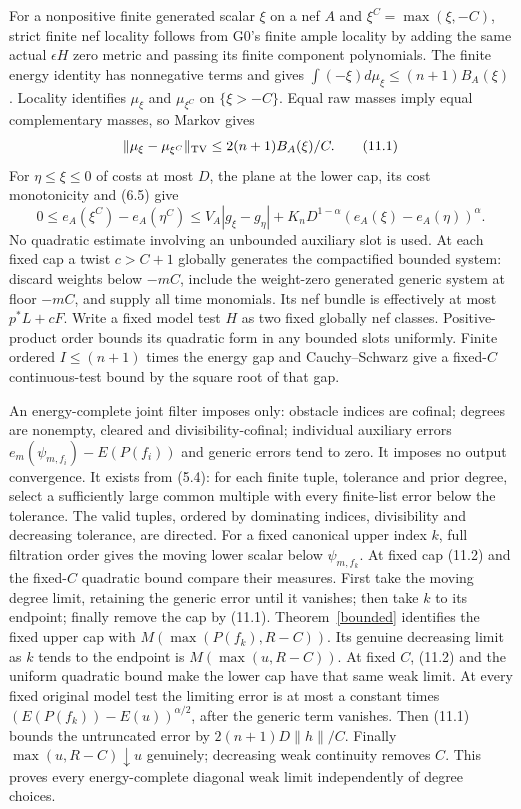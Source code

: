 \documentclass[10pt]{article}
\begin{document}
For a nonpositive finite generated scalar $\xi$ on a nef $A$ and
$\xi^C=\max(\xi,-C)$, strict finite nef locality follows from G0's
finite ample locality by adding the same actual $\epsilon H$ zero metric
and passing its finite component polynomials. The finite energy identity
has nonnegative terms and gives
$\int(-\xi)d\mu_\xi\leq(n+1)B_A(\xi)$.
Locality identifies $\mu_\xi$ and $\mu_{\xi^C}$ on $\{\xi>-C\}$.
Equal raw masses imply equal complementary masses, so Markov gives
\[
 \|\mu_\xi-\mu_{\xi^C}\|_{\rm TV}
       \leq 2(n+1)B_A(\xi)/C.
 \tag{11.1}
\]
For $\eta\leq\xi\leq0$ of costs at most $D$, the plane at the
lower cap, its cost monotonicity and (6.5) give
\[
 0\leq e_A(\xi^C)-e_A(\eta^C)
 \leq V_A|g_\xi-g_\eta|
       +K_nD^{1-\alpha}(e_A(\xi)-e_A(\eta))^\alpha.
 \tag{11.2}
\]
No quadratic estimate involving an unbounded auxiliary slot is used.
At each fixed cap a twist $c>C+1$ globally generates the compactified
bounded system: discard weights below $-mC$, include the weight-zero
generated generic system at floor $-mC$, and supply all time monomials.
Its nef bundle is effectively at most $p^*L+cF$.
Write a fixed model test $H$ as two fixed globally nef classes.
Positive-product order bounds its quadratic form in any bounded slots
uniformly. Finite ordered $I\leq(n+1)$ times the energy gap and
Cauchy--Schwarz give a fixed-$C$ continuous-test bound by the square
root of that gap.

An energy-complete joint filter imposes only: obstacle indices are
cofinal; degrees are nonempty, cleared and divisibility-cofinal;
individual auxiliary errors
$e_m(\psi_{m,f_i})-E(P(f_i))$ and generic errors tend to zero.
It imposes no output convergence. It exists from (5.4): for each
finite tuple, tolerance and prior degree, select a sufficiently large
common multiple with every finite-list error below the tolerance.
The valid tuples, ordered by dominating indices, divisibility and
decreasing tolerance, are directed. For a fixed canonical upper index
$k$, full filtration order gives the moving lower scalar below
$\psi_{m,f_k}$. At fixed cap (11.2) and the fixed-$C$ quadratic bound
compare their measures. First take the moving degree limit, retaining
the generic error until it vanishes; then take $k$ to its endpoint;
finally remove the cap by (11.1). Theorem~\ref{bounded} identifies the fixed upper cap with
$M(\max(P(f_k),R-C))$. Its genuine decreasing limit as $k$ tends to
the endpoint is $M(\max(u,R-C))$. At fixed $C$, (11.2) and the uniform
quadratic bound make the lower cap have that same weak limit. At every
fixed original model test the limiting error is at most a constant
times $(E(P(f_k))-E(u))^{\alpha/2}$, after the generic term vanishes.
Then (11.1) bounds the untruncated error by
$2(n+1)D\|h\|/C$. Finally $\max(u,R-C)\downarrow u$ genuinely;
decreasing weak continuity removes $C$. This proves every energy-complete
diagonal weak limit independently of degree choices.
\end{document}
